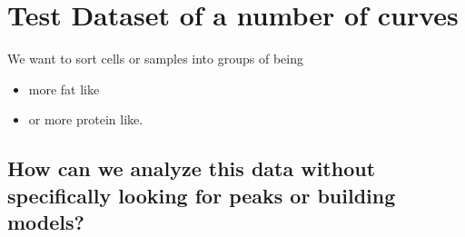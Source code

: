 \documentclass[letterpaper,10pt,english]{sphinxmanual}
\begin{document}
\noindent{}


\section{Test Dataset of a number of curves}
\label{\detokenize{06-ShapeAnalysis:test-dataset-of-a-number-of-curves}}
\sphinxAtStartPar
We want to sort cells or samples into groups of being
\begin{itemize}
\item {} 
\sphinxAtStartPar
more fat like

\item {} 
\sphinxAtStartPar
or more protein like.

\end{itemize}


\subsection{How can we analyze this data without specifically looking for peaks or building models?}
\label{\detokenize{06-ShapeAnalysis:how-can-we-analyze-this-data-without-specifically-looking-for-peaks-or-building-models}}
\end{document}
